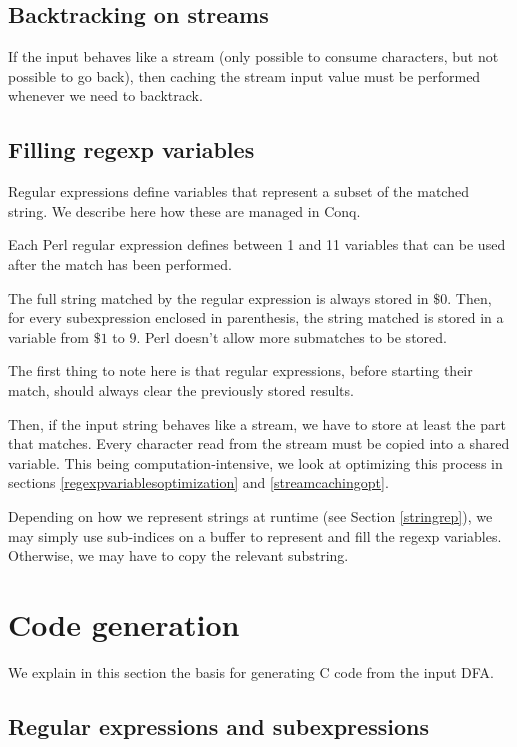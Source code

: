 \documentclass[11pt,a4paper]{report}
\newcommand{\regexp}[1]{$#1$}
\begin{document}
\subsection{Backtracking on streams}

If the input behaves like a stream (only possible to consume characters, but not possible to go back), then caching the stream input value must be performed whenever we need to backtrack.

\subsection{Filling regexp variables}
\label{regexpvariables}

Regular expressions define variables that represent a subset of the matched string. We describe here how these are managed in Conq.

Each Perl regular expression defines between 1 and 11 variables that can be used after the match has been performed.

The full string matched by the regular expression is always stored in \regexp{\$0}. Then, for every subexpression enclosed in parenthesis, the string matched is stored in a variable from \regexp{\$1} to \regexp{9}. Perl doesn't allow more submatches to be stored.

The first thing to note here is that regular expressions, before starting their match, should always clear the previously stored results.

Then, if the input string behaves like a stream, we have to store at least the part that matches. Every character read from the stream must be copied into a shared variable. This being computation-intensive, we look at optimizing this process in sections \ref{regexpvariablesoptimization} and \ref{streamcachingopt}.

Depending on how we represent strings at runtime (see Section \ref{stringrep}), we may simply use sub-indices on a buffer to represent and fill the regexp variables. Otherwise, we may have to copy the relevant substring.

\section{Code generation}

We explain in this section the basis for generating C code from the input DFA.

\subsection{Regular expressions and subexpressions}
\end{document}

